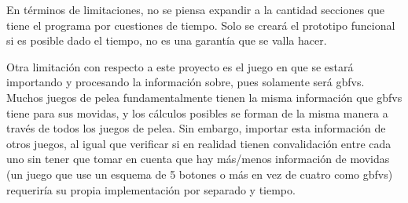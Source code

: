 En términos de limitaciones, no se piensa expandir a la cantidad secciones que tiene el programa por cuestiones de tiempo. Solo se creará el prototipo funcional si es posible dado el tiempo, no es una garantía que se valla hacer.

Otra limitación con respecto a este proyecto es el juego en que se estará importando y procesando la información sobre, pues solamente será \gls{gbfvs}. Muchos juegos de pelea fundamentalmente tienen la misma información que \gls{gbfvs} tiene para sus movidas, y los cálculos posibles se forman de la misma manera a través de todos los juegos de pelea. Sin embargo, importar esta información de otros juegos, al igual que verificar si en realidad tienen convalidación entre cada uno sin tener que tomar en cuenta que hay más/menos información de movidas (un juego que use un esquema de 5 botones o más en vez de cuatro como \gls{gbfvs}) requeriría su propia implementación por separado y tiempo. 
